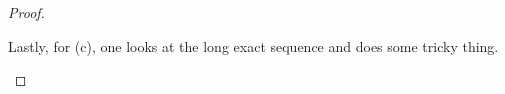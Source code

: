 \documentclass[../notes.tex]{subfiles}
\begin{document}
\begin{proof}
\begin{itemize}
		Lastly, for (c), one looks at the long exact sequence and does some tricky thing.
		\qedhere
	\end{itemize}
\end{proof}
\end{document}
